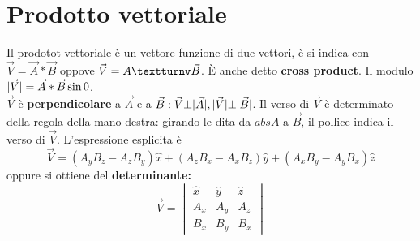 \section{Prodotto vettoriale}
Il prodotot vettoriale è un vettore funzione di due vettori, è si indica con $\vec{V}=\vec{A}*\vec{B}$ oppove
$\vec{V}=A\textturnv \vec{B}$. È anche detto \textbf{cross product}. Il modulo
$\lvert\vec{V}\rvert=\vec{A}*\vec{B}\sin0$.\\
$\vec{V}$ è \textbf{perpendicolare} a $\vec{A}$ e a
$\vec{B}:\vec{V}\bot \lvert\vec{A}\rvert,\lvert\vec{V}\rvert\bot\lvert\vec{B}\rvert$. Il verso di $\vec{V}$ è determinato della
regola della mano destra: girando le dita da $abs{A} \text { a } \vec{B}$, il pollice indica il verso di $\vec{V}$. L'espressione esplicita è
\begin{equation}
  \vec{V}=(A_yB_z-A_zB_y)\hat{x}+(A_zB_x-A_xB_z)\hat{y}+(A_xB_y-A_yB_x)\hat{z}
\end{equation}
oppure si ottiene del \textbf{determinante:}
\begin{equation}
  \vec{V}=\begin{vmatrix}
            \hat{x}&\hat{y}&\hat{z}\\
            A_x&A_y&A_z\\
            B_x&B_y&B_x
          \end{vmatrix}
\end{equation}
